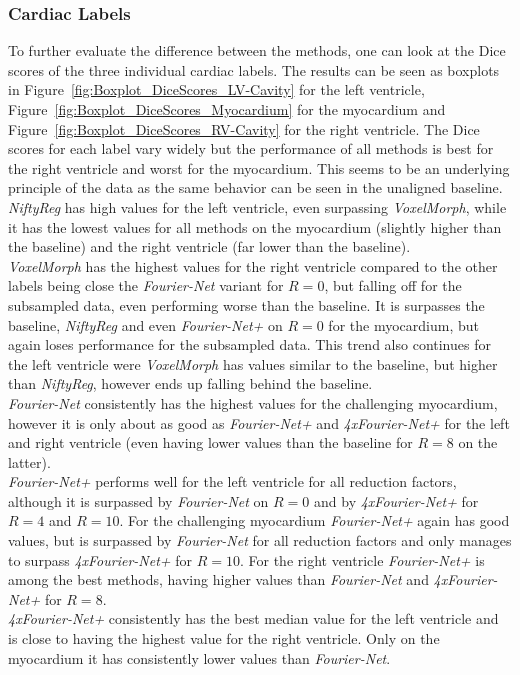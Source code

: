 \subsubsection{Cardiac Labels}
To further evaluate the difference between the methods, one can look at the Dice scores of the three individual cardiac labels. The results can be seen as boxplots in Figure~\ref{fig:Boxplot_DiceScores_LV-Cavity} for the left ventricle, Figure~\ref{fig:Boxplot_DiceScores_Myocardium} for the myocardium and Figure~\ref{fig:Boxplot_DiceScores_RV-Cavity} for the right ventricle. The Dice scores for each label vary widely but the performance of all methods is best for the right ventricle and worst for the myocardium. This seems to be an underlying principle of the data as the same behavior can be seen in the unaligned baseline. \\
\emph{NiftyReg} has high values for the left ventricle, even surpassing \emph{VoxelMorph}, while it has the lowest values for all methods on the myocardium (slightly higher than the baseline) and the right ventricle (far lower than the baseline). \\
\emph{VoxelMorph} has the highest values for the right ventricle compared to the other labels being close the \emph{Fourier-Net} variant for $R=0$, but falling off for the subsampled data, even performing worse than the baseline. It is surpasses the baseline, \emph{NiftyReg} and even \emph{Fourier-Net+} on $R=0$ for the myocardium, but again loses performance for the subsampled data. This trend also continues for the left ventricle were \emph{VoxelMorph} has values similar to the baseline, but higher than \emph{NiftyReg}, however ends up falling behind the baseline. \\
\emph{Fourier-Net} consistently has the highest values for the challenging myocardium, however it is only about as good as \emph{Fourier-Net+} and \emph{4xFourier-Net+} for the left and right ventricle (even having lower values than the baseline for $R=8$ on the latter). \\
\emph{Fourier-Net+} performs well for the left ventricle for all reduction factors, although it is surpassed by \emph{Fourier-Net} on $R=0$ and by \emph{4xFourier-Net+} for $R=4$ and $R=10$. For the challenging myocardium \emph{Fourier-Net+} again has good values, but is surpassed by \emph{Fourier-Net} for all reduction factors and only manages to surpass \emph{4xFourier-Net+} for $R=10$. For the right ventricle \emph{Fourier-Net+} is among the best methods, having higher values than \emph{Fourier-Net} and \emph{4xFourier-Net+} for $R=8$.\\
\emph{4xFourier-Net+} consistently has the best median value for the left ventricle and is close to having the highest value for the right ventricle. Only on the myocardium it has consistently lower values than \emph{Fourier-Net}.


